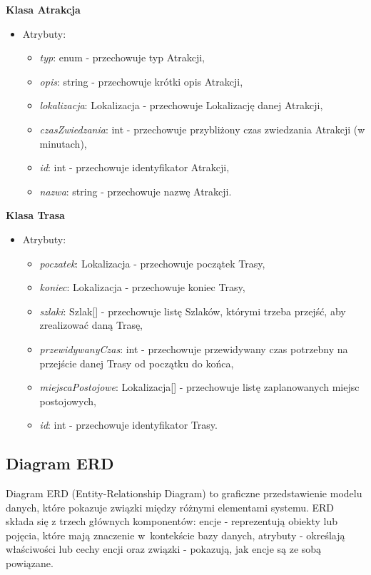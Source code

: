     \textbf{Klasa Atrakcja}
    \begin{itemize}
        \item []Atrybuty:
        \begin{itemize}
            \item \textit{typ}: enum - przechowuje typ Atrakcji,
            \item \textit{opis}: string - przechowuje krótki opis Atrakcji,
            \item \textit{lokalizacja}: Lokalizacja - przechowuje Lokalizację danej Atrakcji,
            \item \textit{czasZwiedzania}: int - przechowuje przybliżony czas zwiedzania Atrakcji (w minutach),
            \item \textit{id}: int - przechowuje identyfikator Atrakcji,
            \item \textit{nazwa}: string - przechowuje nazwę Atrakcji.
        \end{itemize}
    \end{itemize}
    \textbf{Klasa Trasa}
    \begin{itemize}
        \item []Atrybuty:
        \begin{itemize}
            \item \textit{poczatek}: Lokalizacja - przechowuje początek Trasy,
            \item \textit{koniec}: Lokalizacja - przechowuje koniec Trasy,
            \item \textit{szlaki}: Szlak[] - przechowuje listę Szlaków, którymi trzeba przejść, aby zrealizować daną Trasę,
            \item \textit{przewidywanyCzas}: int - przechowuje przewidywany czas potrzebny na przejście danej Trasy od początku do końca,
            \item \textit{miejscaPostojowe}: Lokalizacja[] - przechowuje listę zaplanowanych miejsc postojowych,
            \item \textit{id}: int - przechowuje identyfikator Trasy.
        \end{itemize}
    \end{itemize}

     \subsection{Diagram ERD}
   Diagram ERD (Entity-Relationship Diagram) to graficzne przedstawienie modelu danych, które pokazuje związki między różnymi elementami systemu. ERD składa się z trzech głównych komponentów: encje - reprezentują obiekty lub pojęcia, które mają znaczenie w~kontekście bazy danych, atrybuty - określają właściwości lub cechy encji oraz związki - pokazują, jak encje są ze sobą powiązane.

